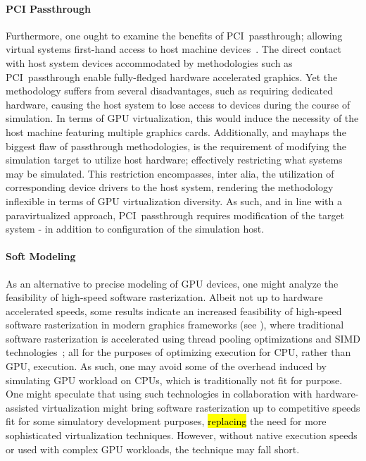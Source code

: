 \paragraph{PCI Passthrough}
\label{par:backgroundandrelatedwork_graphicsvirtualization_pcipassthrough}
Furthermore, one ought to examine the benefits of PCI~passthrough; allowing virtual systems first-hand access to host machine devices~.
The direct contact with host system devices accommodated by methodologies such as PCI~passthrough enable fully-fledged hardware accelerated graphics.
Yet the methodology suffers from several disadvantages, such as requiring dedicated hardware, causing the host system to lose access to devices during the course of simulation.
In terms of GPU virtualization, this would induce the necessity of the host machine featuring multiple graphics cards.
Additionally, and mayhaps the biggest flaw of passthrough methodologies, is the requirement of modifying the simulation target to utilize host hardware; effectively restricting what systems may be simulated.
This restriction encompasses, inter alia, the utilization of corresponding device drivers to the host system, rendering the methodology inflexible in terms of GPU virtualization diversity.
As such, and in line with a paravirtualized approach, PCI~passthrough requires modification of the target system - in addition to configuration of the simulation host.

\paragraph{Soft Modeling}
\label{par:backgroundandrelatedwork_graphicsvirtualization_softmodeling}
As an alternative to precise modeling of GPU devices, one might analyze the feasibility of high-speed software rasterization.
Albeit not up to hardware accelerated speeds, some results indicate an increased feasibility of high-speed software rasterization in modern graphics frameworks (see ), where traditional software rasterization is accelerated using thread pooling optimizations and SIMD technologies~; all for the purposes of optimizing execution for CPU, rather than GPU, execution.
As such, one may avoid some of the overhead induced by simulating GPU workload on CPUs, which is traditionally not fit for purpose.
One might speculate that using such technologies in collaboration with hardware-assisted virtualization might bring software rasterization up to competitive speeds fit for some simulatory development purposes, \hl{replacing} the need for more sophisticated virtualization techniques.
However, without native execution speeds or used with complex GPU workloads, the technique may fall short.

